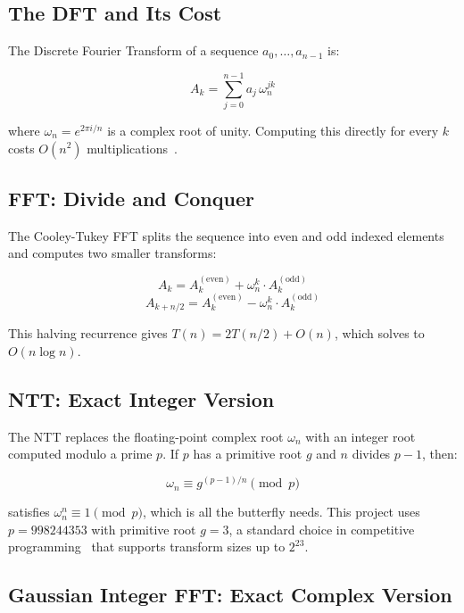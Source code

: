 \documentclass[conference]{IEEEtran}
\begin{document}
\subsection{The DFT and Its Cost}

The Discrete Fourier Transform of a sequence $a_0, \dots, a_{n-1}$ is:

\begin{equation}
A_k = \sum_{j=0}^{n-1} a_j \,\omega_n^{jk}
\end{equation}

where $\omega_n = e^{2\pi i / n}$ is a complex root of unity. Computing this directly for every $k$ costs $O(n^2)$ multiplications~\cite{clrs}.

\subsection{FFT: Divide and Conquer}

The Cooley-Tukey FFT splits the sequence into even and odd indexed elements and computes two smaller transforms:

\begin{equation}
A_k = A_k^{(\text{even})} + \omega_n^k \cdot A_k^{(\text{odd})}
\end{equation}
\begin{equation}
A_{k+n/2} = A_k^{(\text{even})} - \omega_n^k \cdot A_k^{(\text{odd})}
\end{equation}

This halving recurrence gives $T(n) = 2T(n/2) + O(n)$, which solves to $O(n \log n)$.

\subsection{NTT: Exact Integer Version}

The NTT replaces the floating-point complex root $\omega_n$ with an integer root computed modulo a prime $p$. If $p$ has a primitive root $g$ and $n$ divides $p - 1$, then:

\begin{equation}
\omega_n \equiv g^{(p-1)/n} \pmod{p}
\end{equation}

satisfies $\omega_n^n \equiv 1 \pmod{p}$, which is all the butterfly needs. This project uses $p = 998244353$ with primitive root $g = 3$, a standard choice in competitive programming~\cite{ntt_programming} that supports transform sizes up to $2^{23}$.

\subsection{Gaussian Integer FFT: Exact Complex Version}
\end{document}
